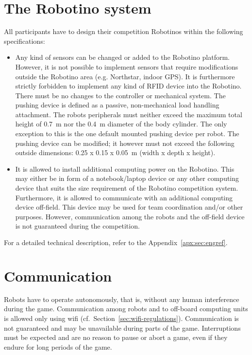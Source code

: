 \documentclass[12pt,twoside]{article}
\newcommand{\Robotino}{Robotino}
\newcommand{\refsec}[1]{Section~\ref{#1}}
\begin{document}

\section{The Robotino system} \label{sec:robotino}

All participants have to design their competition Robotinos within
the following specifications:

\begin{itemize}
\item Any kind of sensors can be changed or added to the Robotino
  platform.  However, it is not possible to implement sensors that
  require modifications outside the Robotino area (e.g. Northstar,
  indoor GPS).  It is furthermore strictly forbidden to implement any
  kind of RFID device into the Robotino. There must be no changes to
  the controller or mechanical system. The pushing device is defined
  as a passive, non-mechanical load handling attachment. The robots
  peripherals must neither exceed the maximum total height of
  \SI{0.7}{\metre} nor the \SI{0.4}{\metre} diameter of the body
  cylinder. The only exception to this is the one default mounted
  pushing device per robot. The pushing device can be modified; it
  however must not exceed the following outside dimensions: \SI{0.25 x
    0.15 x 0.05}{\metre} (width x depth x height).
\item It is allowed to install additional computing power on the
  \Robotino. This may either be in form of a notebook/laptop device or
  any other computing device that suits the size requirement of the
  \Robotino{} competition system. Furthermore, it is allowed to
  communicate with an additional computing device off-field. This
  device may be used for team coordination and/or other
  purposes. However, communication among the robots and the off-field
  device is not guaranteed during the competition.
\end{itemize}

For a detailed technical description, refer to the
Appendix~\ref{apx:sec:engref}.

\section{Communication}
Robots have to operate autonomously, that is, without any human
interference during the game. Communication among robots and to
off-board computing units is allowed only using wifi
(cf.~\refsec{sec:wifi-regulations}). Communication is not guaranteed
and may be unavailable during parts of the game. Interruptions must be
expected and are no reason to pause or abort a game, even if they
endure for long periods of the game.
\end{document}
